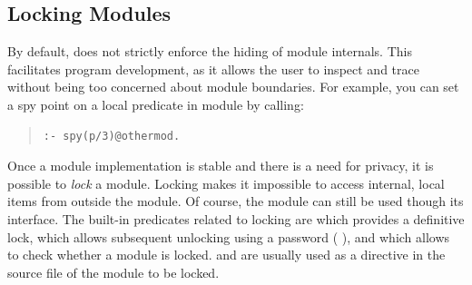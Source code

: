 \subsection{Locking Modules\label{locking}}
By default, {\eclipse} does not strictly enforce the hiding of
module internals. This facilitates program development, as it allows the user
to inspect and trace without being too concerned about module
boundaries. For example, you can set a spy point on a local predicate
in module  by calling:
\begin{quote}
\begin{verbatim}
:- spy(p/3)@othermod.
\end{verbatim}
\end{quote}
Once a module implementation is stable and there is a need for privacy,
it is possible to \emph{lock} a module. Locking makes it impossible
to access internal, local items from outside the module. Of course,
the module can still be used though its interface.
The built-in predicates related to locking are
 which provides
a definitive lock,
which allows subsequent unlocking using a password (
),
and
which allows to check whether a module is locked.
 and
 are
usually used as a directive in the source file of the module to be locked.

